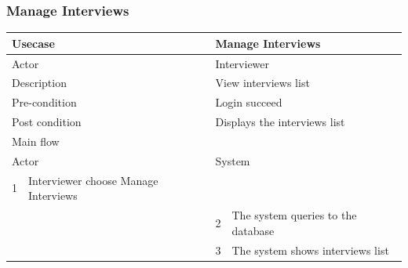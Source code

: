 \documentclass[a4paper]{article}
\begin{document}
\subsubsection{Manage Interviews}
\begin{tabular}{|l|p{5cm}||l|p{5cm}|}
	\hline 
	\multicolumn{2}{|p{5cm}|}{Usecase} & \multicolumn{2}{|p{5cm}|}{Manage Interviews}\\ 
	\hline 
	\multicolumn{2}{|p{5cm}|}{Actor} & \multicolumn{2}{|p{5cm}|}{Interviewer} \\ 
	\hline 
	\multicolumn{2}{|p{5cm}|}{Description} & \multicolumn{2}{|p{5cm}|}{View interviews list}\\
	\hline
	\multicolumn{2}{|p{5cm}|}{Pre-condition} & \multicolumn{2}{|p{5cm}|}{Login succeed}\\
	\hline
	\multicolumn{2}{|p{5cm}|}{Post condition} & \multicolumn{2}{|p{5cm}|}{Displays the interviews list} \\
	\hline
	\multicolumn{4}{|l|}{Main flow} \\
	\hline
	\multicolumn{2}{|p{5cm}|}{Actor} & \multicolumn{2}{|p{5cm}|}{System} \\
	\hline
	1 & Interviewer choose Manage Interviews & & \\
	\hline
	& & 2 & The system queries to the database \\
	\hline 
	& & 3 & The system shows interviews list  \\
	\hline
\end{tabular}
\end{document}
